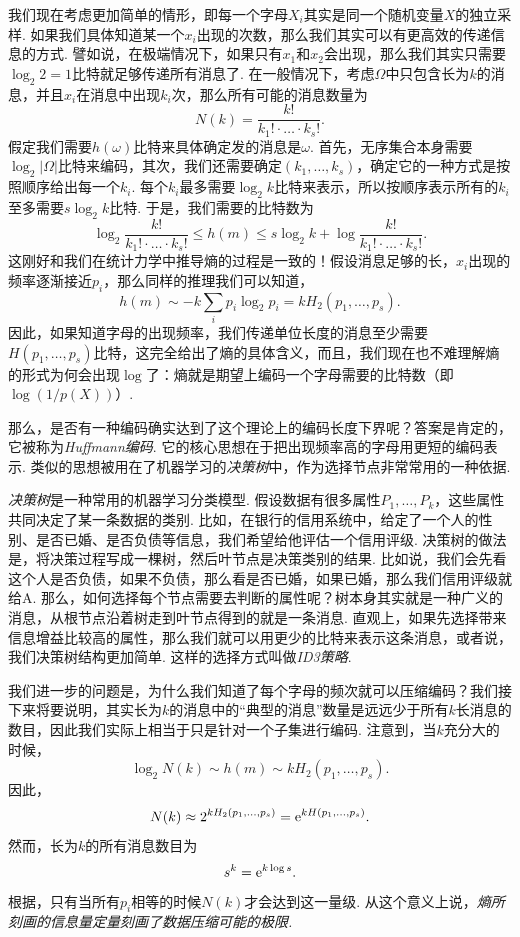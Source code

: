 我们现在考虑更加简单的情形，即每一个字母$X_i$其实是同一个随机变量$X$的独立采样. 如果我们具体知道某一个$x_i$出现的次数，那么我们其实可以有更高效的传递信息的方式. 譬如说，在极端情况下，如果只有$x_1$和$x_2$会出现，那么我们其实只需要$\log_2 2=1$比特就足够传递所有消息了. 在一般情况下，考虑$\Omega$中只包含长为$k$的消息，并且$x_i$在消息中出现$k_i$次，那么所有可能的消息数量为
\[N(k)=\frac{k!}{k_1!\cdot\dots\cdot k_s!}.\]
假定我们需要$h(\omega)$比特来具体确定发的消息是$\omega$. 首先，无序集合本身需要$\log_2 |\Omega|$比特来编码，其次，我们还需要确定$(k_1,\dots,k_s)$，确定它的一种方式是按照顺序给出每一个$k_i$. 每个$k_i$最多需要$\log_2 k$比特来表示，所以按顺序表示所有的$k_i$至多需要$s\log_2 k$比特. 于是，我们需要的比特数为
\[\log_2\frac{k!}{k_1!\cdot\dots\cdot k_s!}\leq h(m)\leq s\log_2k+\log\frac{k!}{k_1!\cdot\dots\cdot k_s!}.\]
这刚好和我们在统计力学中推导熵的过程是一致的！假设消息足够的长，$x_i$出现的频率逐渐接近$p_i$，那么同样的推理我们可以知道，
\[h(m)\sim -k\sum_i p_i\log_2 p_i=kH_2(p_1,\dots,p_s).\]
因此，如果知道字母的出现频率，我们传递单位长度的消息至少需要$H(p_1,\dots,p_s)$比特，这完全给出了熵的具体含义，而且，我们现在也不难理解熵的形式为何会出现$\log$了：熵就是期望上编码一个字母需要的比特数（即$\log(1/p(X))$）.

那么，是否有一种编码确实达到了这个理论上的编码长度下界呢？答案是肯定的，它被称为\emph{Huffmann编码}. 它的核心思想在于把出现频率高的字母用更短的编码表示. 类似的思想被用在了机器学习的\emph{决策树}中，作为选择节点非常常用的一种依据.
\begin{remark}
    \emph{决策树}是一种常用的机器学习分类模型. 假设数据有很多属性$P_1,\dots,P_k$，这些属性共同决定了某一条数据的类别. 比如，在银行的信用系统中，给定了一个人的性别、是否已婚、是否负债等信息，我们希望给他评估一个信用评级. 决策树的做法是，将决策过程写成一棵树，然后叶节点是决策类别的结果. 比如说，我们会先看这个人是否负债，如果不负债，那么看是否已婚，如果已婚，那么我们信用评级就给A. 那么，如何选择每个节点需要去判断的属性呢？树本身其实就是一种广义的消息，从根节点沿着树走到叶节点得到的就是一条消息. 直观上，如果先选择带来信息增益比较高的属性，那么我们就可以用更少的比特来表示这条消息，或者说，我们决策树结构更加简单. 这样的选择方式叫做\emph{ID3策略}.
\end{remark}

我们进一步的问题是，为什么我们知道了每个字母的频次就可以压缩编码？我们接下来将要说明，其实长为$k$的消息中的“典型的消息”数量是远远少于所有$k$长消息的数目，因此我们实际上相当于只是针对一个子集进行编码. 注意到，当$k$充分大的时候，
\[\log_2 N(k)\sim h(m)\sim kH_2(p_1,\dots,p_s).\]
因此，
\[N(k)\approx 2^{kH_2(p_1,\dots,p_s)}=\mathrm{e}^{kH(p_1,\dots,p_s)}.\]
然而，长为$k$的所有消息数目为
\[s^k=\mathrm{e}^{k\log s}.\]
根据，只有当所有$p_i$相等的时候$N(k)$才会达到这一量级. 从这个意义上说，\emph{熵所刻画的信息量定量刻画了数据压缩可能的极限.}

